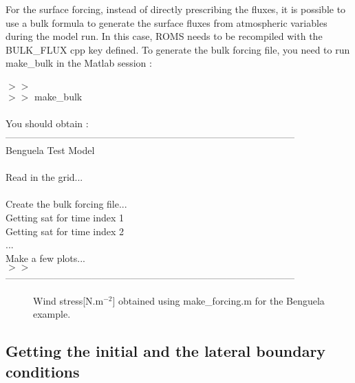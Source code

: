 For the surface forcing, instead of directly prescribing the fluxes, it is possible 
to use a bulk formula to generate the surface fluxes from atmospheric variables 
during the model run. In this case, ROMS needs to be recompiled with the BULK\_FLUX
cpp key defined. To generate the bulk forcing file, you need to run make\_bulk
in the Matlab session :
\\ \\
$>>$\\
$>>$ make\_bulk\\\\
You should obtain :\\
------------------------------------------------------------------------------------------\\
Benguela Test Model\\
\\
 Read in the grid...\\
\\
 Create the bulk forcing file...\\
Getting sat for time index 1\\
Getting sat for time index 2\\
...\\
Make a few plots...\\
$>>$\\
------------------------------------------------------------------------------------------\\

\begin{figure}[h!]
\centerline{}
\caption{Wind stress[N.m$^{-2}$] obtained using make\_forcing.m for the Benguela example.}
\label{fig:forcing}
\end{figure}

\subsection{Getting the initial and the lateral boundary conditions}

